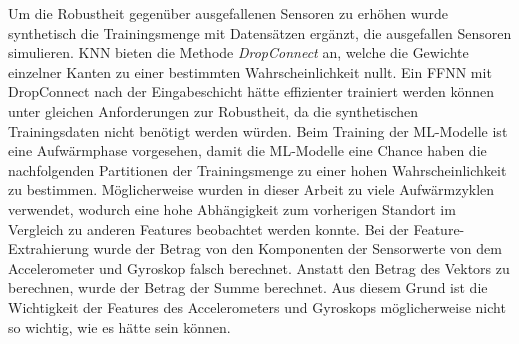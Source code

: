 \newline
\newline
Um die Robustheit gegenüber ausgefallenen Sensoren zu erhöhen wurde synthetisch die Trainingsmenge mit Datensätzen ergänzt, die ausgefallen Sensoren simulieren.
KNN bieten die Methode \textit{DropConnect} an, welche die Gewichte einzelner Kanten zu einer bestimmten Wahrscheinlichkeit nullt.
Ein FFNN mit DropConnect nach der Eingabeschicht hätte effizienter trainiert werden können unter gleichen Anforderungen zur Robustheit,
da die synthetischen Trainingsdaten nicht benötigt werden würden.
\newline
\newline
Beim Training der ML-Modelle ist eine Aufwärmphase vorgesehen, damit die ML-Modelle eine Chance haben die nachfolgenden Partitionen der Trainingsmenge
zu einer hohen Wahrscheinlichkeit zu bestimmen.
Möglicherweise wurden in dieser Arbeit zu viele Aufwärmzyklen verwendet, wodurch eine hohe Abhängigkeit zum vorherigen Standort im Vergleich zu anderen Features beobachtet werden konnte.
\newline
\newline
Bei der Feature-Extrahierung wurde der Betrag von den Komponenten der Sensorwerte von dem Accelerometer und Gyroskop falsch berechnet.
Anstatt den Betrag des Vektors zu berechnen, wurde der Betrag der Summe berechnet.
Aus diesem Grund ist die Wichtigkeit der Features des Accelerometers und Gyroskops möglicherweise nicht so wichtig, wie es hätte sein können.

